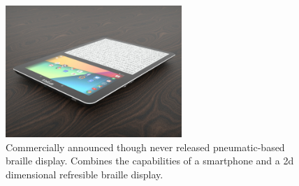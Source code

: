 \begin{figure}[ht]\centering
    \includegraphics[height=5cm]{figures/Blitab_product.jpg}
\caption[Commercial pneumatic braille display]{Commercially announced though never released pneumatic-based braille display. Combines the capabilities of a smartphone and a 2d dimensional refresible braille display.}
\label{fig:Blitab-product}
\end{figure}